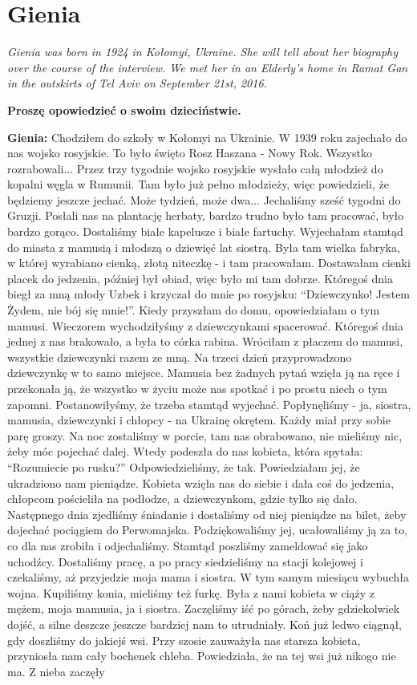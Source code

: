 \section{Gienia}
\begin{otherlanguage}{polish}
\textit{Gienia was born in 1924 in Kołomyi, Ukraine. She will tell about her biography over the course of the interview. We met her in an Elderly’s home in Ramat Gan in the outskirts of Tel Aviv on September 21st, 2016.}\par
\vspace*{2em}
\textbf{Proszę opowiedzieć o swoim dzieciństwie.}

\textbf{Gienia:} Chodziłem do szkoły w Kołomyi na Ukrainie. W 1939 roku zajechało do nas wojsko rosyjskie. To było święto Rosz Haszana - Nowy Rok. Wszystko rozrabowali... Przez trzy tygodnie wojsko rosyjskie wysłało całą młodzież do kopalni węgla w Rumunii. Tam było już pełno młodzieży, więc powiedzieli, że będziemy jeszcze jechać. Może tydzień, może dwa... Jechaliśmy sześć tygodni do Gruzji. Posłali nas na plantację herbaty, bardzo trudno było tam pracować, było bardzo gorąco. Dostaliśmy białe kapelusze i białe fartuchy. Wyjechałam stamtąd do miasta z mamusią i młodszą o dziewięć lat siostrą. Była tam wielka fabryka, w której wyrabiano cienką, złotą niteczkę - i tam pracowałam. Dostawałam cienki placek do jedzenia, później był obiad, więc było mi tam dobrze. Któregoś dnia biegł za mną młody Uzbek i krzyczał do mnie po rosyjsku: "`Dziewczynko! Jestem Żydem, nie bój się mnie!"'. Kiedy przyszłam do domu, opowiedziałam o tym mamusi. Wieczorem wychodziłyśmy z dziewczynkami spacerować. Któregoś dnia jednej z nas brakowało, a była to córka rabina. Wróciłam z płaczem do mamusi, wszystkie dziewczynki razem ze mną. Na trzeci dzień przyprowadzono dziewczynkę w to samo miejsce. Mamusia bez żadnych pytań wzięła ją na ręce i przekonała ją, że wszystko w życiu może nas spotkać i po prostu niech o tym zapomni. Postanowiłyśmy, że trzeba stamtąd wyjechać. Popłynęliśmy - ja, siostra, mamusia, dziewczynki i chłopcy - na Ukrainę okrętem. Każdy miał przy sobie parę groszy. Na noc zostaliśmy w porcie, tam nas obrabowano, nie mieliśmy nic, żeby móc pojechać dalej. Wtedy podeszła do nas kobieta, która spytała: "`Rozumiecie po rusku?"' Odpowiedzieliśmy, że tak. Powiedziałam jej, że ukradziono nam pieniądze. Kobieta wzięła nas do siebie i dała coś do jedzenia, chłopcom pościeliła na podłodze, a dziewczynkom, gdzie tylko się dało. Następnego dnia zjedliśmy śniadanie i dostaliśmy od niej pieniądze na bilet, żeby dojechać pociągiem do Perwomajska. Podziękowaliśmy jej, ucałowaliśmy ją za to, co dla nas zrobiła i odjechaliśmy. Stamtąd poszliśmy zameldować się jako uchodźcy. Dostaliśmy pracę, a po pracy siedzieliśmy na stacji kolejowej i czekaliśmy, aż przyjedzie moja mama i siostra. W tym samym miesiącu wybuchła wojna. Kupiliśmy konia, mieliśmy też furkę. Była z nami kobieta w ciąży z mężem, moja mamusia, ja i siostra. Zaczęliśmy iść po górach, żeby gdziekolwiek dojść, a silne deszcze jeszcze bardziej nam to utrudniały. Koń już ledwo ciągnął, gdy doszliśmy do jakiejś wsi. Przy szosie zauważyła nas starsza kobieta, przyniosła nam cały bochenek chleba. Powiedziała, że na tej wsi już nikogo nie ma. Z nieba zaczęły 
\end{otherlanguage}
